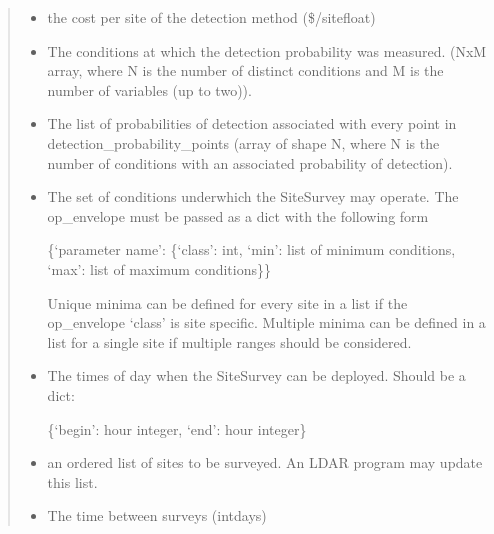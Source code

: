 \documentclass[letterpaper,10pt,english]{sphinxmanual}
\begin{document}
\begin{fulllineitems}
\begin{quote}
\begin{description}
\begin{itemize}
\item {} 
 \textendash{} the cost per site of the detection method (\$/site\textendash{}float)

\item {} 
 \textendash{} The conditions at which the detection probability was measured. (NxM
array, where N is the number of distinct conditions and M is the number of variables (up to two)).

\item {} 
 \textendash{} The list of probabilities of detection associated with every point in
detection\_probability\_points (array of shape N, where N is the number of conditions with an associated
probability of detection).

\item {} 
 \textendash{} 
The set of conditions underwhich the SiteSurvey may operate. The op\_envelope must be
passed as a dict with the following form\textendash{}

\{‘parameter name’: \{‘class’: int, ‘min’: list of minimum conditions, ‘max’: list of maximum conditions\}\}

Unique minima can be defined for every site in a list if the op\_envelope ‘class’ is site specific. Multiple
minima can be defined in a list for a single site if multiple ranges should be considered.


\item {} 
 \textendash{} 
The times of day when the SiteSurvey can be deployed. Should be a dict:

\{‘begin’: hour integer, ‘end’: hour integer\}


\item {} 
 \textendash{} an ordered list of sites to be surveyed. An LDAR program may update this list.

\item {} 
 \textendash{} The time between surveys (int\textendash{}days)

\end{itemize}

\end{description}\end{quote}


\end{fulllineitems}
\end{document}
